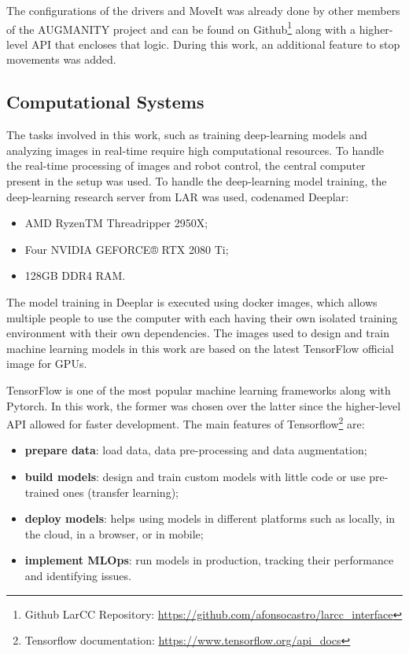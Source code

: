 The configurations of the drivers and MoveIt was already done by other members of the AUGMANITY project and can be found on Github\footnote{Github LarCC Repository: \url{https://github.com/afonsocastro/larcc_interface}} along with a higher-level API that encloses that logic. During this work, an additional feature to stop movements was added.

\subsection{Computational Systems}

The tasks involved in this work, such as training deep-learning models and analyzing images in real-time require high computational resources. To handle the real-time processing of images and robot control, the central computer present in the setup was used. To handle the deep-learning model training, the deep-learning research server from LAR was used, codenamed Deeplar:
\begin{itemize}
    \item AMD RyzenTM Threadripper 2950X;
    \item Four NVIDIA GEFORCE® RTX 2080 Ti;
    \item 128GB DDR4 RAM.
\end{itemize}

The model training in Deeplar is executed using docker images, which allows multiple people to use the computer with each having their own isolated training environment with their own dependencies. The images used to design and train machine learning models in this work are based on the latest TensorFlow official image for GPUs.

TensorFlow is one of the most popular machine learning frameworks along with Pytorch. In this work, the former was chosen over the latter since the higher-level API allowed for faster development. The main features of Tensorflow\footnote{Tensorflow documentation: \url{https://www.tensorflow.org/api_docs}} are:
\begin{itemize}
    \item \textbf{prepare data}: load data, data pre-processing and data augmentation;
    \item \textbf{build models}: design and train custom models with little code or use pre-trained ones (transfer learning);
    \item \textbf{deploy models}: helps using models in different platforms such as locally, in the cloud, in a browser, or in mobile;
    \item \textbf{implement MLOps}: run models in production, tracking their performance and identifying issues.
\end{itemize}

